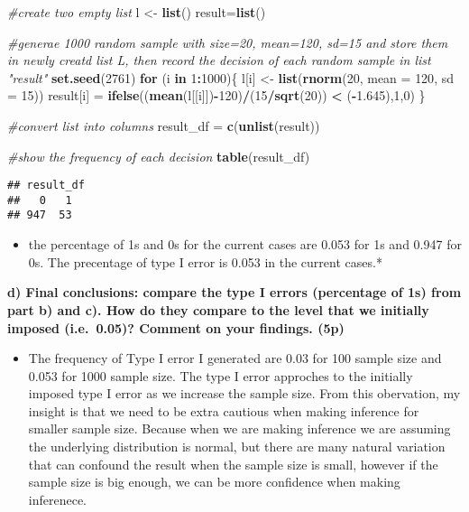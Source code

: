 \documentclass[]{article}
\newenvironment{Shaded}{\begin{snugshade}}{\end{snugshade}}
\newcommand{\CommentTok}[1]{\textcolor[rgb]{0.56,0.35,0.01}{\textit{#1}}}
\newcommand{\ControlFlowTok}[1]{\textcolor[rgb]{0.13,0.29,0.53}{\textbf{#1}}}
\newcommand{\DataTypeTok}[1]{\textcolor[rgb]{0.13,0.29,0.53}{#1}}
\newcommand{\DecValTok}[1]{\textcolor[rgb]{0.00,0.00,0.81}{#1}}
\newcommand{\FloatTok}[1]{\textcolor[rgb]{0.00,0.00,0.81}{#1}}
\newcommand{\KeywordTok}[1]{\textcolor[rgb]{0.13,0.29,0.53}{\textbf{#1}}}
\newcommand{\NormalTok}[1]{#1}
\newcommand{\OperatorTok}[1]{\textcolor[rgb]{0.81,0.36,0.00}{\textbf{#1}}}
\newcommand{\StringTok}[1]{\textcolor[rgb]{0.31,0.60,0.02}{#1}}
\providecommand{\tightlist}{%
  \setlength{\itemsep}{0pt}\setlength{\parskip}{0pt}}
\begin{document}
\begin{Shaded}
\begin{Highlighting}[]
\CommentTok{#create two empty list}
\NormalTok{  l <-}\StringTok{ }\KeywordTok{list}\NormalTok{()}
\NormalTok{result=}\KeywordTok{list}\NormalTok{()}

\CommentTok{#generae 1000 random sample with size=20, mean=120, sd=15 and store them in newly creatd list L, then record the decision of each random sample in list "result"}
\KeywordTok{set.seed}\NormalTok{(}\DecValTok{2761}\NormalTok{)}
\ControlFlowTok{for}\NormalTok{ (i }\ControlFlowTok{in} \DecValTok{1}\OperatorTok{:}\DecValTok{1000}\NormalTok{)\{}
\NormalTok{l[i] <-}\StringTok{ }\KeywordTok{list}\NormalTok{(}\KeywordTok{rnorm}\NormalTok{(}\DecValTok{20}\NormalTok{, }\DataTypeTok{mean =} \DecValTok{120}\NormalTok{, }\DataTypeTok{sd =} \DecValTok{15}\NormalTok{))}
\NormalTok{result[i] =}\StringTok{ }\KeywordTok{ifelse}\NormalTok{((}\KeywordTok{mean}\NormalTok{(l[[i]])}\OperatorTok{-}\DecValTok{120}\NormalTok{)}\OperatorTok{/}\NormalTok{(}\DecValTok{15}\OperatorTok{/}\KeywordTok{sqrt}\NormalTok{(}\DecValTok{20}\NormalTok{)) }\OperatorTok{<}\StringTok{ }\NormalTok{(}\OperatorTok{-}\FloatTok{1.645}\NormalTok{),}\DecValTok{1}\NormalTok{,}\DecValTok{0}\NormalTok{)}
\NormalTok{\}}

\CommentTok{#convert list into columns}
\NormalTok{result_df =}\StringTok{ }\KeywordTok{c}\NormalTok{(}\KeywordTok{unlist}\NormalTok{(result))}

\CommentTok{#show the frequency of each decision}
\KeywordTok{table}\NormalTok{(result_df)}
\end{Highlighting}
\end{Shaded}

\begin{verbatim}
## result_df
##   0   1 
## 947  53
\end{verbatim}

\begin{itemize}
\tightlist
\item
  the percentage of 1s and 0s for the current cases are 0.053 for 1s and
  0.947 for 0s. The precentage of type I error is 0.053 in the current
  cases.*
\end{itemize}

\textbf{d) Final conclusions: compare the type I errors (percentage of
1s) from part b) and c). How do they compare to the level that we
initially imposed (i.e.~0.05)? Comment on your findings. (5p)}

\begin{itemize}
\tightlist
\item
  The frequency of Type I error I generated are 0.03 for 100 sample size
  and 0.053 for 1000 sample size. The type I error approches to the
  initially imposed type I error as we increase the sample size. From
  this obervation, my insight is that we need to be extra cautious when
  making inference for smaller sample size. Because when we are making
  inference we are assuming the underlying distribution is normal, but
  there are many natural variation that can confound the result when the
  sample size is small, however if the sample size is big enough, we can
  be more confidence when making inferenece.
\end{itemize}
\end{document}
